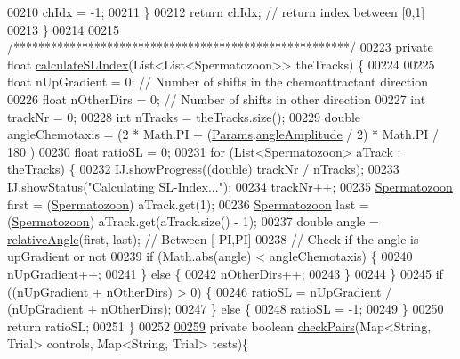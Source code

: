 \begin{DoxyCode}
{00210       chIdx = -1;
00211     \}
00212     \textcolor{keywordflow}{return} chIdx; \textcolor{comment}{// return index between [0,1]}
00213   \}
00214 
00215   \textcolor{comment}{/******************************************************/}
\hypertarget{_chemotaxis_8java_source_l00223}{}\hyperlink{classanalysis_1_1_chemotaxis_ae3ff70acea28007b345ce335321b82fe}{00223}   \textcolor{keyword}{private} \textcolor{keywordtype}{float} \hyperlink{classanalysis_1_1_chemotaxis_ae3ff70acea28007b345ce335321b82fe}{calculateSLIndex}(List<List<Spermatozoon>> theTracks) \{
00224 
00225     \textcolor{keywordtype}{float} nUpGradient = 0; \textcolor{comment}{// Number of shifts in the chemoattractant direction}
00226     \textcolor{keywordtype}{float} nOtherDirs = 0; \textcolor{comment}{// Number of shifts in other direction}
00227     \textcolor{keywordtype}{int} trackNr = 0;
00228     \textcolor{keywordtype}{int} nTracks = theTracks.size();
00229     \textcolor{keywordtype}{double} angleChemotaxis = (2 * Math.PI + (\hyperlink{classdata_1_1_params}{Params}.\hyperlink{classdata_1_1_params_a42568ad774d8f4ccb9535aeda39fc883}{angleAmplitude} / 2) * Math.PI / 180
      ) %
00230     \textcolor{keywordtype}{float} ratioSL = 0;
00231     \textcolor{keywordflow}{for} (List<Spermatozoon> aTrack : theTracks) \{
00232       IJ.showProgress((\textcolor{keywordtype}{double}) trackNr / nTracks);
00233       IJ.showStatus(\textcolor{stringliteral}{"Calculating SL-Index..."});
00234       trackNr++;
00235       \hyperlink{classdata_1_1_spermatozoon}{Spermatozoon} first = (\hyperlink{classdata_1_1_spermatozoon}{Spermatozoon}) aTrack.get(1);
00236       \hyperlink{classdata_1_1_spermatozoon}{Spermatozoon} last = (\hyperlink{classdata_1_1_spermatozoon}{Spermatozoon}) aTrack.get(aTrack.size() - 1);
00237       \textcolor{keywordtype}{double} angle = \hyperlink{classanalysis_1_1_chemotaxis_ab23f946e0f1055d348e975e3058f323d}{relativeAngle}(first, last); \textcolor{comment}{// Between [-PI,PI]}
00238       \textcolor{comment}{// Check if the angle is upGradient or not}
00239       \textcolor{keywordflow}{if} (Math.abs(angle) < angleChemotaxis) \{
00240         nUpGradient++;
00241       \} \textcolor{keywordflow}{else} \{
00242         nOtherDirs++;
00243       \}
00244     \}
00245     \textcolor{keywordflow}{if} ((nUpGradient + nOtherDirs) > 0) \{
00246       ratioSL = nUpGradient / (nUpGradient + nOtherDirs);
00247     \} \textcolor{keywordflow}{else} \{
00248       ratioSL = -1;
00249     \}
00250     \textcolor{keywordflow}{return} ratioSL;
00251   \}
00252 
\hypertarget{_chemotaxis_8java_source_l00259}{}\hyperlink{classanalysis_1_1_chemotaxis_a1ebc6d4aaad3ec1c0eca87acb729ffb5}{00259}   \textcolor{keyword}{private} \textcolor{keywordtype}{boolean} \hyperlink{classanalysis_1_1_chemotaxis_a1ebc6d4aaad3ec1c0eca87acb729ffb5}{checkPairs}(Map<String, Trial> controls, Map<String, Trial> tests)\{
}
\end{DoxyCode}
